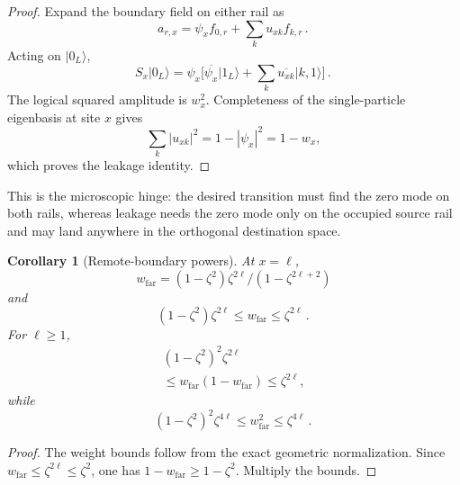 \documentclass[11pt,a4paper]{article}
\newtheorem{corollary}[theorem]{Corollary}
\theoremstyle{remark}
\begin{document}
\begin{proof}
Expand the boundary field on either rail as
\[
a_{r,x}=\psi_x f_{0,r}+\sum_{k} u_{xk}f_{k,r}\mathpunct{.}
\]
Acting on $\lvert 0_L\rangle{}$,
\[
S_x\lvert 0_L\rangle{}=\psi_x\bigl[\overline{\psi_x}\lvert 1_L\rangle{}+\sum_{k} \overline{u_{xk}}\lvert k,1\rangle{}\bigr]\mathpunct{.}
\]
The logical squared amplitude is $w_x^{2}$. Completeness of the single-particle eigenbasis at site $x$ gives
\[
\sum_{k} |u_{xk}|^{2}=1-|\psi_x|^{2}=1-w_x\mathpunct{,}
\]
which proves the leakage identity.
\end{proof}
This is the microscopic hinge: the desired transition must find the zero mode on both rails, whereas leakage needs the zero mode only on the occupied source rail and may land anywhere in the orthogonal destination space.
\begin{corollary}[Remote-boundary powers]
At $x=\ell$,
\[
w_{\mathrm{far}}=(1-\zeta^{2})\zeta^{2\ell}/(1-\zeta^{2\ell+2})
\]
and
\[
(1-\zeta^{2})\zeta^{2\ell}\le w_{\mathrm{far}}\le \zeta^{2\ell}\mathpunct{.}
\]
For $\ell\ge 1$,
\[
\begin{gathered}
(1-\zeta^{2})^{2} \zeta^{2\ell} \\
\le w_{\mathrm{far}}(1-w_{\mathrm{far}})\le \zeta^{2\ell}\mathpunct{,}
\end{gathered}
\]
while
\[
(1-\zeta^{2})^{2} \zeta^{4\ell}\le w_{\mathrm{far}}^{2}\le \zeta^{4\ell}\mathpunct{.}
\]
\end{corollary}
\begin{proof}
The weight bounds follow from the exact geometric normalization. Since $w_{\mathrm{far}}\le \zeta^{2\ell}\le \zeta^{2}$, one has $1-w_{\mathrm{far}}\ge 1-\zeta^{2}$. Multiply the bounds.
\end{proof}
\end{document}
